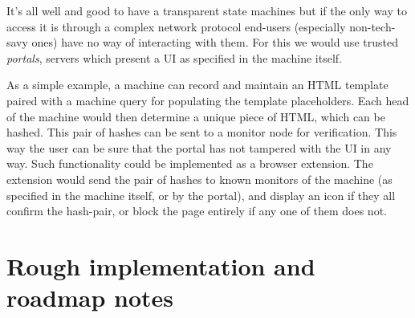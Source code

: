 \documentclass[a4paper, oneside, 10pt]{amsart}
\begin{document}
It's all well and good to have a transparent state machines but if the only way
to access it is through a complex network protocol end-users (especially
non-tech-savy ones) have no way of interacting with them. For this we would use
trusted \emph{portals}, servers which present a UI as specified in the machine
itself.

As a simple example, a machine can record and maintain an HTML template paired
with a machine query for populating the template placeholders. Each head of the
machine would then determine a unique piece of HTML, which can be hashed. This
pair of hashes can be sent to a monitor node for verification. This way the user
can be sure that the portal has not tampered with the UI in any way. Such
functionality could be implemented as a browser extension. The extension would
send the pair of hashes to known monitors of the machine (as specified in the
machine itself, or by the portal), and display an icon if they all confirm the
hash-pair, or block the page entirely if any one of them does not.

\section{Rough implementation and roadmap notes}\label{impl}
\end{document}
